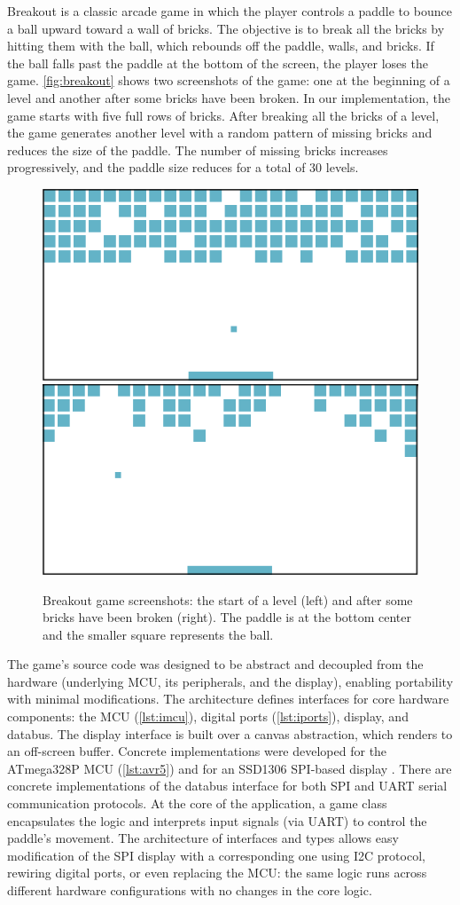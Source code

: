 \documentclass[10pt,sigplan,screen,anonymous]{acmart}
\begin{document}
Breakout is a classic arcade game in which the player controls a paddle to bounce a ball upward toward a wall of bricks. The objective is to break all the bricks by hitting them with the ball, which rebounds off the paddle, walls, and bricks. If the ball falls past the paddle at the bottom of the screen, the player loses the game. \autoref{fig:breakout} shows two screenshots of the game: one at the beginning of a level and another after some bricks have been broken. In our implementation, the game starts with five full rows of bricks. After breaking all the bricks of a level, the game generates another level with a random pattern of missing bricks and reduces the size of the paddle. The number of missing bricks increases progressively, and the paddle size reduces for a total of 30 levels. 

\begin{figure}[hp]
\includegraphics[width=.23\textwidth]{breakout1}\hspace{5pt}\includegraphics[width=.23\textwidth]{breakout2}
\caption{Breakout game screenshots: the start of a level (left) and after some bricks have been broken (right). The paddle is at the bottom center and the smaller square represents the ball.}
\label{fig:breakout}
\end{figure}

The game's source code was designed to be abstract and decoupled from the hardware (underlying MCU, its peripherals, and the display), enabling portability with minimal modifications. The architecture defines interfaces for core hardware components: the MCU (\autoref{lst:imcu}), digital ports (\autoref{lst:iports}), display, and databus. The display interface is built over a canvas abstraction, which renders to an off-screen buffer. Concrete implementations were developed for the ATmega328P MCU \cite{atmel328p} (\autoref{lst:avr5}) and for an SSD1306 SPI-based display \cite{ssd1306}. There are concrete implementations of the databus interface for both SPI and UART serial communication protocols. At the core of the application, a game class encapsulates the logic and interprets input signals (via UART) to control the paddle’s movement. The architecture of interfaces and types allows easy modification of the SPI display with a corresponding one using I2C protocol, rewiring digital ports, or even replacing the MCU: the same logic runs across different hardware configurations with no changes in the core logic.
\end{document}
